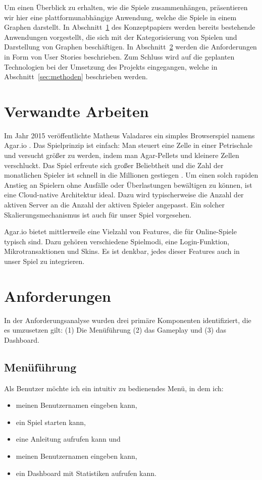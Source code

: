 \documentclass[a4paper, 10pt, conference]{IEEEtran}
\begin{document}
Um einen Überblick zu erhalten, wie die Spiele zusammenhängen, präsentieren wir hier eine plattformunabhängige Anwendung, welche die Spiele in einem Graphen darstellt. In Abschnitt~\ref{sec:verwandte_arbeiten} des Konzeptpapiers werden bereits bestehende Anwendungen vorgestellt, die sich mit der Kategorisierung von Spielen und Darstellung von Graphen beschäftigen.
In Abschnitt~\ref{sec:anforderungen} werden die Anforderungen in Form von User Stories beschrieben. Zum Schluss wird auf die geplanten Technologien bei der Umsetzung des Projekts eingegangen, welche in Abschnitt~\ref{sec:methoden} beschrieben werden.


\section{Verwandte Arbeiten}\label{sec:verwandte_arbeiten}

Im Jahr 2015 veröffentlichte Matheus Valadares ein simples Browserspiel namens Agar.io \cite{agario}. Das Spielprinzip ist einfach: Man steuert eine Zelle in einer Petrischale und versucht größer zu werden, indem man Agar-Pellets und kleinere Zellen verschluckt. Das Spiel erfreute sich großer Beliebtheit und die Zahl der monatlichen Spieler ist schnell in die Millionen gestiegen \cite{takahashi2017}. Um einen solch rapiden Anstieg an Spielern ohne Ausfälle oder Überlastungen bewältigen zu können, ist eine Cloud-native Architektur ideal. Dazu wird typischerweise die Anzahl der aktiven Server an die Anzahl der aktiven Spieler angepasst. Ein solcher Skalierungsmechanismus ist auch für unser Spiel vorgesehen.

Agar.io bietet mittlerweile eine Vielzahl von Features, die für Online-Spiele typisch sind. Dazu gehören verschiedene Spielmodi, eine Login-Funktion, Mikrotransaktionen und Skins. Es ist denkbar, jedes dieser Features auch in unser Spiel zu integrieren.

\section{Anforderungen}\label{sec:anforderungen}

In der Anforderungsanalyse wurden drei primäre Komponenten identifiziert, die es umzusetzen gilt: (1) Die Menüführung (2) das Gameplay und (3) das Dashboard.


\subsection{Menüführung}
Als Benutzer möchte ich ein intuitiv zu bedienendes Menü, in dem ich:
\begin{itemize}
	\item meinen Benutzernamen eingeben kann,
	\item ein Spiel starten kann,
	\item eine Anleitung aufrufen kann und
	\item meinen Benutzernamen eingeben kann,
	\item ein Dashboard mit Statistiken aufrufen kann.
\end{itemize}
\end{document}
